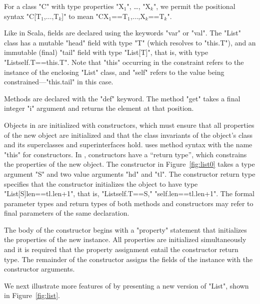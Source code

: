 For a class
\xcd"C"
with type properties
\xcdmath"X$_1$",
\dots,
\xcdmath"X$_k$",
we permit the positional syntax \xcdmath"C[T$_1$,$\dots$,T$_k$]"
to mean \xcdmath"C{X$_1$==T$_1$,$\dots$,X$_k$==T$_k$}".

Like in Scala, fields are declared using the keywords \xcd"var"
or \xcd"val".  The \xcd"List" class has a mutable \xcd"head"
field with type \xcd"T" (which resolves to \xcd"this.T"), and an
immutable (final) \xcd"tail" field with type \xcd"List[T]", that
is, with type \xcd"List{self.T==this.T}".  Note that \xcd"this" occurring
in the constraint refers to the instance of the enclosing
\xcd"List" class,
and \xcd"self" refers to the value being
constrained---\xcd"this.tail" in this case.

Methods are declared with the \xcd"def" keyword.
The method \xcd"get" takes a final integer \xcd"i" argument
and returns the element at that position.

Objects in \Xten{} are initialized with constructors, which
must ensure that all properties of the new object
are initialized and that the class invariants of the object's
class and its superclasses and superinterfaces hold.
\Xten{} uses method syntax with the name
\xcd"this" for constructors.
In \Xten{}, constructors have a ``return type'', which constrains
the properties of the new object.  The constructor in
Figure~\ref{fig:list0} takes a type argument \xcd"S"
and two value arguments \xcd"hd" and \xcd"tl".  The constructor
return type specifies that the constructor initializes the
object to have type \xcd"List[S]{len==tl.len+1}", that is,
\xcd"List{self.T==S," \xcd"self.len==tl.len+1}".
The formal parameter types and return types of both methods and
constructors may refer to final parameters of the same
declaration.

The body of the constructor
begins with a \xcd"property" statement that initializes the
properties of the new instance.  All properties are initialized
simultaneously and it is required that the property assignment
entail the constructor return type.
The remainder of the constructor assigns the fields of the
instance with the constructor arguments.

We next illustrate more features of \Xten by
presenting a new version of \xcd"List", shown
in Figure~\ref{fig:list}.


